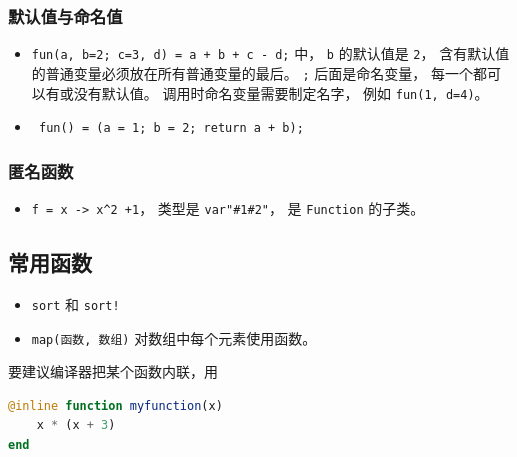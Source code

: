 \subsubsection{默认值与命名值}
\begin{itemize}
\item \verb`fun(a, b=2; c=3, d) = a + b + c - d;` 中， \verb`b` 的默认值是 \verb`2`， 含有默认值的普通变量必须放在所有普通变量的最后。 \verb`;` 后面是命名变量， 每一个都可以有或没有默认值。 调用时命名变量需要制定名字， 例如 \verb`fun(1, d=4)`。
\item \verb` fun() = (a = 1; b = 2; return a + b);`
\end{itemize}

\subsubsection{匿名函数}
\begin{itemize}
\item \verb`f = x -> x^2 +1`， 类型是 \verb`var"#1#2"`， 是 \verb`Function` 的子类。
\end{itemize}

\subsection{常用函数}
\begin{itemize}
\item \verb`sort` 和 \verb`sort!`
\item \verb`map(函数, 数组)` 对数组中每个元素使用函数。
\end{itemize}

要建议编译器把某个函数内联，用
\begin{lstlisting}[language=julia]
@inline function myfunction(x)
    x * (x + 3)
end
\end{lstlisting}

